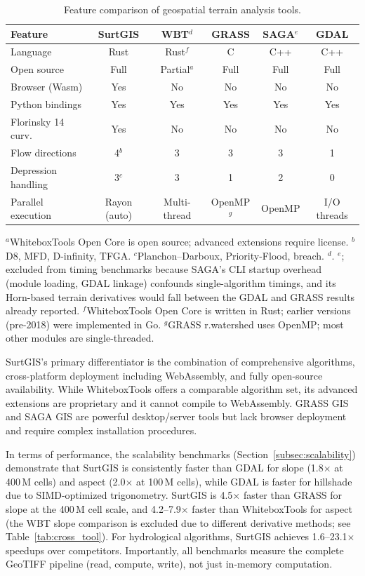 \documentclass[preprint,review,12pt,authoryear]{elsarticle}
\begin{document}
\begin{table}[htbp]
\centering
\caption{Feature comparison of geospatial terrain analysis tools.}
\label{tab:comparison}
\begin{tabular}{@{}lccccc@{}}
\toprule
Feature & SurtGIS & WBT$^{d}$ & GRASS & SAGA$^{e}$ & GDAL \\
\midrule
Language & Rust & Rust$^{f}$ & C & C++ & C++ \\
Open source & Full & Partial$^{a}$ & Full & Full & Full \\
Browser (Wasm) & Yes & No & No & No & No \\
Python bindings & Yes & Yes & Yes & Yes & Yes \\
Florinsky 14 curv. & Yes & No & No & No & No \\
Flow directions & 4$^{b}$ & 3 & 3 & 3 & 1 \\
Depression handling & 3$^{c}$ & 3 & 1 & 2 & 0 \\
Parallel execution & Rayon (auto) & Multi-thread & OpenMP$^{g}$ & OpenMP & I/O threads \\
\bottomrule
\end{tabular}
\smallskip

{\footnotesize $^{a}$WhiteboxTools Open Core is open source; advanced extensions require license. $^{b}$D8, MFD, D-infinity, TFGA. $^{c}$Planchon--Darboux, Priority-Flood, breach. $^{d}$\citet{lindsay2016wbt}. $^{e}$\citet{conrad2015}; excluded from timing benchmarks because SAGA's CLI startup overhead (module loading, GDAL linkage) confounds single-algorithm timings, and its Horn-based terrain derivatives would fall between the GDAL and GRASS results already reported. $^{f}$WhiteboxTools Open Core is written in Rust; earlier versions (pre-2018) were implemented in Go. $^{g}$GRASS r.watershed uses OpenMP; most other modules are single-threaded.}
\end{table}

SurtGIS's primary differentiator is the combination of comprehensive algorithms, cross-platform deployment including WebAssembly, and fully open-source availability. While WhiteboxTools offers a comparable algorithm set, its advanced extensions are proprietary and it cannot compile to WebAssembly. GRASS GIS and SAGA GIS are powerful desktop/server tools but lack browser deployment and require complex installation procedures.

In terms of performance, the scalability benchmarks (Section~\ref{subsec:scalability}) demonstrate that SurtGIS is consistently faster than GDAL for slope (1.8$\times$ at 400\,M cells) and aspect (2.0$\times$ at 100\,M cells), while GDAL is faster for hillshade due to SIMD-optimized trigonometry. SurtGIS is 4.5$\times$ faster than GRASS for slope at the 400\,M cell scale, and 4.2--7.9$\times$ faster than WhiteboxTools for aspect (the WBT slope comparison is excluded due to different derivative methods; see Table~\ref{tab:cross_tool}). For hydrological algorithms, SurtGIS achieves 1.6--23.1$\times$ speedups over competitors. Importantly, all benchmarks measure the complete GeoTIFF pipeline (read, compute, write), not just in-memory computation.
\end{document}
